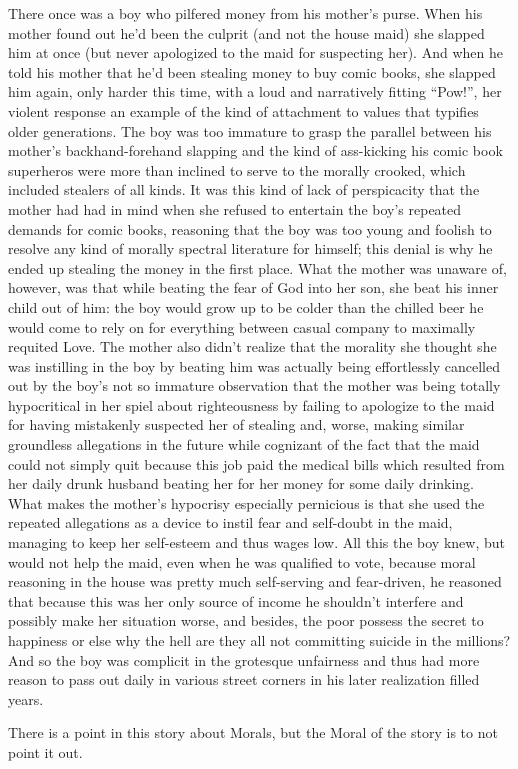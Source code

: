 \documentclass{article}
\begin{document}
\newline

There once was a boy who pilfered money from his mother's purse. When
his mother found out he'd been the culprit (and not the house maid) she
slapped him at once (but never apologized to the maid for suspecting
her). And when he told his mother that he'd been stealing money to buy
comic books, she slapped him again, only harder this time, with a loud
and narratively fitting ``Pow!'', her violent response an example of the
kind of attachment to values that typifies older generations. The boy
was too immature to grasp the parallel between his mother's
backhand-forehand slapping and the kind of ass-kicking his comic book
superheros were more than inclined to serve to the morally crooked,
which included stealers of all kinds. It was this kind of lack of
perspicacity that the mother had had in mind when she refused to
entertain the boy's repeated demands for comic books, reasoning that the
boy was too young and foolish to resolve any kind of morally spectral
literature for himself; this denial is why he ended up stealing the
money in the first place. What the mother was unaware of, however, was
that while beating the fear of God into her son, she beat his inner
child out of him: the boy would grow up to be colder than the chilled
beer he would come to rely on for everything between casual company to
maximally requited Love. The mother also didn't realize that the
morality she thought she was instilling in the boy by beating him was
actually being effortlessly cancelled out by the boy's not so immature
observation that the mother was being totally hypocritical in her spiel
about righteousness by failing to apologize to the maid for having
mistakenly suspected her of stealing and, worse, making similar
groundless allegations in the future while cognizant of the fact that
the maid could not simply quit because this job paid the medical bills
which resulted from her daily drunk husband beating her for her money
for some daily drinking. What makes the mother's hypocrisy especially
pernicious is that she used the repeated allegations as a device to
instil fear and self-doubt in the maid, managing to keep her self-esteem
and thus wages low. All this the boy knew, but would not help the maid,
even when he was qualified to vote, because moral reasoning in the house
was pretty much self-serving and fear-driven, he reasoned that because
this was her only source of income he shouldn't interfere and possibly
make her situation worse, and besides, the poor possess the secret to
happiness or else why the hell are they all not committing suicide in
the millions? And so the boy was complicit in the grotesque unfairness
and thus had more reason to pass out daily in various street corners in
his later realization filled years.

\newline\newline

There is a point in this story about Morals, but the Moral of the story
is to not point it out.
\end{document}
